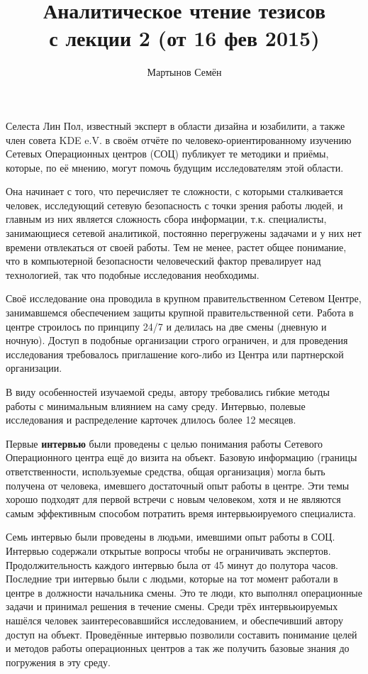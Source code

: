 \documentclass[10pt,a4paper]{article}
\author{Мартынов Семён}
\title{Аналитическое чтение тезисов\\ с лекции 2 (от 16 фев 2015)}
\begin{document}
\maketitle

\begin{multicols}{2}

Селеста Лин Пол, известный эксперт в области дизайна и юзабилити, а также член совета KDE e.V. в своём отчёте по человеко-ориентированному изучению Сетевых Операционных центров (СОЦ) публикует те методики и приёмы, которые, по её мнению, могут помочь будущим исследователям этой области.

Она начинает с того, что перечисляет те сложности, с которыми сталкивается человек, исследующий сетевую безопасность с точки зрения работы людей, и главным из них является сложность сбора информации, т.к. специалисты, занимающиеся сетевой аналитикой, постоянно перегружены задачами и у них нет времени отвлекаться от своей работы. Тем не менее, растет общее понимание, что в компьютерной безопасности человеческий фактор превалирует над технологией, так что подобные исследования необходимы.

Своё исследование она проводила в крупном правительственном Сетевом Центре, занимавшемся обеспечением защиты крупной правительственной сети. Работа в центре строилось по принципу 24/7 и делилась на две смены (дневную и ночную). Доступ в подобные организации строго ограничен, и для проведения исследования требовалось приглашение кого-либо из Центра или партнерской организации.

В виду особенностей изучаемой среды, автору требовались гибкие методы работы с минимальным влиянием на саму среду. Интервью, полевые исследования и распределение карточек длилось более 12 месяцев.

Первые \textbf{интервью} были проведены с целью понимания работы Сетевого Операционного центра ещё до визита на объект. Базовую информацию (границы ответственности, используемые средства, общая организация) могла быть получена от человека, имевшего достаточный опыт работы в центре. Эти темы хорошо подходят для первой встречи с новым человеком, хотя и не являются самым эффективным способом потратить время интервьюируемого специалиста.

Семь интервью были проведены в людьми, имевшими опыт работы в СОЦ. Интервью содержали открытые вопросы  чтобы не ограничивать экспертов. Продолжительность каждого интервью была от 45 минут до полутора часов.
Последние три интервью были с людьми, которые на тот момент работали в центре в должности начальника смены. Это те люди, кто выполнял операционные задачи и принимал решения в течение смены. Среди трёх интервьюируемых нашёлся человек заинтересовавшийся исследованием, и обеспечивший автору доступ на объект.
Проведённые интервью позволили составить понимание целей и методов работы операционных центров а так же получить базовые знания до погружения в эту среду.


\end{multicols}
\end{document}
